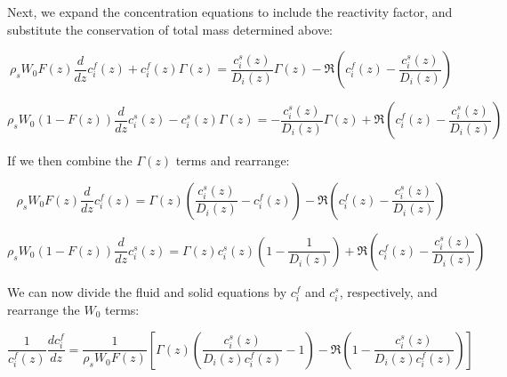 \documentclass[draft]{agujournal2019}
\begin{document}
Next, we expand the concentration equations to include the reactivity factor, and substitute the conservation of total mass determined above:

\begin{linenomath*}
\begin{equation}
    \rho_s W_0 F(z)\frac{d}{dz} c_i^f(z) + c_i^f(z)\Gamma(z) = \frac{c_i^s(z)}{D_i(z)}\Gamma(z) -\Re\left(c_i^f(z) - \frac{c_i^s(z)}{D_i(z)}\right)\label{eq:36}
\end{equation}
\end{linenomath*}

\begin{linenomath*}
\begin{equation}
    \rho_s W_0 (1 - F(z))\frac{d}{dz}c_i^s(z) - c_i^s(z)\Gamma(z) = -\frac{c_i^s(z)}{D_i(z)}\Gamma(z) + \Re\left(c_i^f(z) - \frac{c_i^s(z)}{D_i(z)}\right)\label{eq:37}
\end{equation}
\end{linenomath*}

If we then combine the $\Gamma(z)$ terms and rearrange:

\begin{linenomath*}
\begin{equation}
    \rho_s W_0 F(z)\frac{d}{dz} c_i^f(z) = \Gamma(z)\left(\frac{c_i^s(z)}{D_i(z)} - c_i^f(z)\right) - \Re\left(c_i^f(z) - \frac{c_i^s(z)}{D_i(z)}\right)\label{eq:38}
\end{equation}
\end{linenomath*}

\begin{linenomath*}
\begin{equation}
    \rho_s W_0 (1 - F(z))\frac{d}{dz}c_i^s(z) = \Gamma(z) c_i^s(z)\left(1 - \frac{1}{D_i(z)}\right)+ \Re\left(c_i^f(z) - \frac{c_i^s(z)}{D_i(z)}\right)\label{eq:39}
\end{equation}
\end{linenomath*}

We can now divide the fluid and solid equations by $c_i^f$ and $c_i^s$, respectively, and rearrange the $W_0$ terms:

\begin{linenomath*}
\begin{equation}
    \frac{1}{c_i^f(z)}\frac{dc_i^f}{dz} = \frac{1}{\rho_s W_0 F(z)}\left[\Gamma(z)\left(\frac{c_i^s(z)}{D_i(z) c_i^f(z)} - 1\right) - \Re\left(1 - \frac{c_i^s(z)}{D_i(z) c_i^f(z)}\right)\right]\label{eq:40}
\end{equation}
\end{linenomath*}
\end{document}
